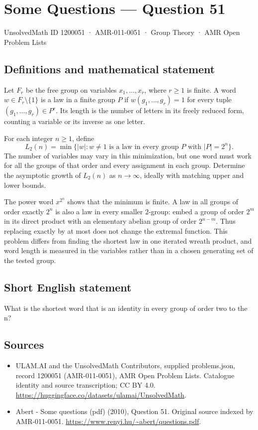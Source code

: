 \documentclass[11pt,a4paper]{article}
\begin{document}
\section*{Some Questions — Question 51}\label{1200051}
{\small UnsolvedMath ID 1200051 · AMR-011-0051 · Group Theory · AMR Open Problem Lists}
\subsection{Definitions and mathematical statement}
Let $F_r$ be the free group on variables $x_1,\ldots,x_r$, where $r\geq1$ is finite. A word $w\in F_r\setminus\{1\}$ is a law in a finite group $P$ if $w(g_1,\ldots,g_r)=1$ for every tuple $(g_1,\ldots,g_r)\in P^r$. Its length is the number of letters in its freely reduced form, counting a variable or its inverse as one letter.

For each integer $n\geq1$, define
\[
 L_2(n)=\min\{|w|:w\ne1\text{ is a law in every group }P
                                      \text{ with }|P|=2^n\}.
\]
The number of variables may vary in this minimization, but one word must work for all the groups of that order and every assignment in each group. Determine the asymptotic growth of $L_2(n)$ as $n\to\infty$, ideally with matching upper and lower bounds.

The power word $x^{2^n}$ shows that the minimum is finite. A law in all groups of order exactly $2^n$ is also a law in every smaller $2$-group: embed a group of order $2^m$ in its direct product with an elementary abelian group of order $2^{n-m}$. Thus replacing exactly by at most does not change the extremal function. This problem differs from finding the shortest law in one iterated wreath product, and word length is measured in the variables rather than in a chosen generating set of the tested group.
\subsection{Short English statement}
What is the shortest word that is an identity in every group of order two to the n?
\subsection{Sources}
\begin{itemize}
\item[S1] ULAM.AI and the UnsolvedMath Contributors, supplied problems.json, record 1200051 (AMR-011-0051), AMR Open Problem Lists. Catalogue identity and source transcription; CC BY 4.0.
\url{https://huggingface.co/datasets/ulamai/UnsolvedMath}.
\item[S2] Abert - Some questions (pdf) (2010), Question 51. Original source indexed by AMR-011-0051.
\url{https://www.renyi.hu/~abert/questions.pdf}.
\end{itemize}
\end{document}
